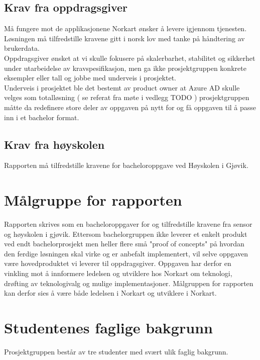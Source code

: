 \subsection{Krav fra oppdragsgiver}
\label{subsec:problemstilling_kravTilOppgaven_Oppdragsgiver}
Må fungere mot de applikasjonene Norkart ønsker å levere igjennom tjenesten. 
\\
Løsningen må tilfredstille kravene gitt i norsk lov med tanke på håndtering av brukerdata. 
\\
Oppdragsgiver ønsket at vi skulle fokusere på skalerbarhet, stabilitet og sikkerhet under utarbeidelse av kravspesifikasjon, men ga ikke prosjektgruppen konkrete eksempler eller tall og jobbe med underveis i prosjektet. 
\\
Underveis i prosjektet ble det bestemt av product owner at Azure AD skulle velges som totalløsning ( se referat fra møte i vedlegg {\color{red}TODO} ) prosjektgruppen måtte da redefinere store deler av oppgaven på nytt for og få oppgaven til å passe inn i et bachelor format.

\subsection{Krav fra høyskolen}
\label{subsec:problemstilling_kravTilOppgaven_Hoyskolen}
Rapporten må tilfredstille kravene for bacheloroppgave ved Høyskolen i Gjøvik. 

\section{Målgruppe for rapporten}
\label{sec:problemstilling_målgruppeForRapporten}
Rapporten skrives som en bacheloroppgaver for og tilfredstille kravene fra sensor og høyskolen i gjøvik. Ettersom bachelorgruppen ikke leverer et enkelt produkt ved endt bachelorprosjekt men heller flere små "proof of concepts" på hvordan den ferdige løsningen skal virke og er anbefalt implementert, vil selve oppgaven være hovedproduktet vi leverer til oppdragsgiver. Oppgaven har derfor en vinkling mot å innformere ledelsen og utviklere hos Norkart om teknologi, drøfting av teknologivalg og mulige implementasjoner. Målgruppen for rapporten kan derfor sies å være både ledelsen i Norkart og utviklere i Norkart. 

\section{Studentenes faglige bakgrunn}
\label{sec:problemstilling_studentenesFagligeBakgrunn}
Prosjektgruppen består av tre studenter med svært ulik faglig bakgrunn. 

